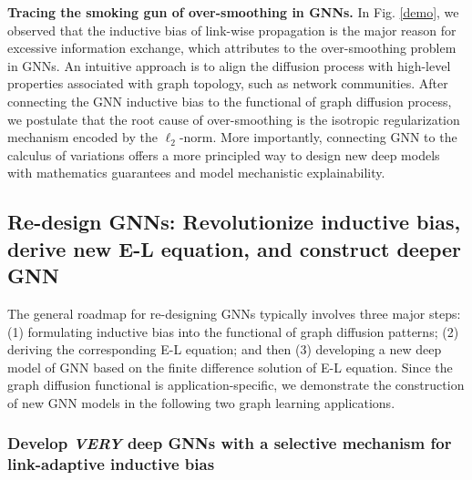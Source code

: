 \documentclass{article}
\begin{document}
\textbf{Tracing the smoking gun of over-smoothing in GNNs.} In Fig. \ref{demo}, we observed that the inductive bias of link-wise propagation is the major reason for excessive information exchange, which attributes to the over-smoothing problem in GNNs. An intuitive approach is to align the diffusion process with high-level properties associated with graph topology, such as network communities.
After connecting the GNN inductive bias to the functional of graph diffusion process, we postulate that the root cause of over-smoothing is the isotropic regularization mechanism encoded by the ${\ell _2}$-norm.
More importantly, connecting GNN to the calculus of variations offers a more principled way to design new deep models with mathematics guarantees and model mechanistic explainability.

\subsection{Re-design GNNs: Revolutionize inductive bias, derive new E-L equation, and construct deeper GNN}
\label{2.2}
The general roadmap for re-designing GNNs typically involves three major steps: (1) formulating inductive bias into the functional of graph diffusion patterns; (2) deriving the corresponding E-L equation; and then (3) developing a new deep model of GNN based on the finite difference solution of E-L equation. Since the graph diffusion functional is application-specific, we demonstrate the construction of new GNN models in the following two graph learning applications.

\subsubsection{Develop \textit{VERY} deep GNNs with a selective mechanism for link-adaptive inductive bias}
\label{TV}
\end{document}
